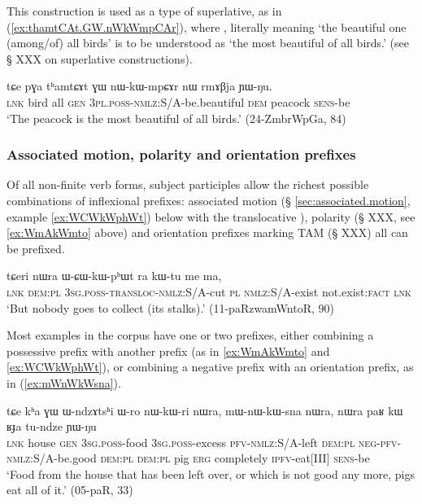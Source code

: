This construction is used as a type of superlative, as in (\ref{ex:thamtCAt.GW.nWkWmpCAr}), where , literally meaning `the beautiful one (among/of) all birds' is to be understood as `the most beautiful of all birds.' (see § XXX on superlative constructions).

 \begin{exe} 
\ex \label{ex:thamtCAt.GW.nWkWmpCAr}
\gll tɕe pɣa tʰamtɕɤt ɣɯ nɯ-kɯ-mpɕɤr nɯ rmɤβja ɲɯ-ŋu.  \\
\textsc{lnk} bird all \textsc{gen} \textsc{3pl}.\textsc{poss}-\textsc{nmlz}:S/A-be.beautiful \textsc{dem} peacock \textsc{sens}-be \\
\glt `The peacock is the most beautiful of all birds.' (24-ZmbrWpGa, 84)
\end{exe}

\subsubsection{Associated motion, polarity and orientation prefixes}  \label{ex:subject.participle.other.prefixes}
Of all non-finite verb forms, subject participles allow the richest possible combinations of inflexional prefixes: associated motion (§ \ref{sec:associated.motion}, example \ref{ex:WCWkWphWt}) below with the translocative ), polarity (§ XXX, see \ref{ex:WmAkWmto} above) and orientation prefixes marking TAM (§ XXX) all can be prefixed. 
 
\begin{exe}
\ex \label{ex:WCWkWphWt}
 \gll tɕeri nɯra ɯ-ɕɯ-kɯ-pʰɯt ra kɯ-tu me ma,   \\
 \textsc{lnk} \textsc{dem}:\textsc{pl} \textsc{3sg}.\textsc{poss}-\textsc{transloc}-\textsc{nmlz}:S/A-cut \textsc{pl} \textsc{nmlz}:S/A-exist not.exist:\textsc{fact} \textsc{lnk} \\
 \glt `But nobody goes to collect (its stalks).' (11-paRzwamWntoR, 90)
\end{exe}

Most examples in the corpus have one or two prefixes, either combining a possessive prefix with another prefix (as in \ref{ex:WmAkWmto} and \ref{ex:WCWkWphWt}), or combining a negative prefix with an orientation prefix, as in (\ref{ex:mWnWkWsna}).

 \begin{exe}
\ex \label{ex:mWnWkWsna}
 \gll tɕe kʰa ɣɯ ɯ-ndzɤtsʰi ɯ-ro nɯ-kɯ-ri nɯra, mɯ-nɯ-kɯ-sna nɯra, nɯra paʁ kɯ ʁɟa tu-ndze ɲɯ-ŋu \\
 \textsc{lnk} house \textsc{gen} \textsc{3sg}.\textsc{poss}-food \textsc{3sg}.\textsc{poss}-excess \textsc{pfv}-\textsc{nmlz}:S/A-left \textsc{dem}:\textsc{pl}  \textsc{neg}-\textsc{pfv}-\textsc{nmlz}:S/A-be.good \textsc{dem}:\textsc{pl} \textsc{dem}:\textsc{pl} pig \textsc{erg} completely  \textsc{ipfv}-eat[III] \textsc{sens}-be \\
 \glt  `Food from the house that has been left over, or which is not good any more, pigs eat all of it.' (05-paR, 33)
\end{exe}

